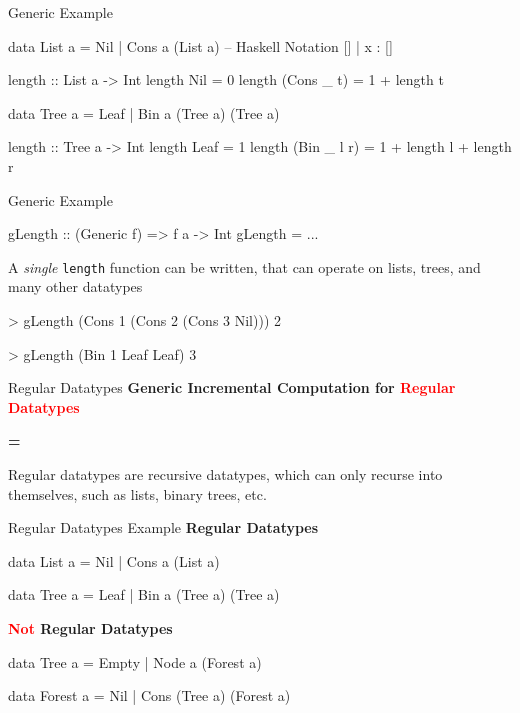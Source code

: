 \begin{slide}{Generic Example}
\begin{haskell}
data List a = Nil | Cons a (List a) -- Haskell Notation [] | x : [] 

length :: List a -> Int
length Nil        = 0
length (Cons _ t) = 1 + length t

data Tree a = Leaf | Bin a (Tree a) (Tree a)

length :: Tree a -> Int
length Leaf        = 1
length (Bin _ l r) = 1 + length l + length r
\end{haskell}
\end{slide}

\begin{slide}{Generic Example}
\begin{chaskell}
gLength :: (Generic f) => f a -> Int
gLength = ...
\end{chaskell}

A \textit{single} \texttt{length} function can be written, that can operate on lists, trees, and many other datatypes

\vspace*{0.5cm}
\begin{haskell}
> gLength (Cons 1 (Cons 2 (Cons 3 Nil)))
    2

> gLength (Bin 1 Leaf Leaf)
    3
\end{haskell}
\end{slide}


\begin{slide}{Regular Datatypes}
\centering
\large \textbf{Generic Incremental Computation for \textcolor{red}{Regular Datatypes}}

\vspace*{.5cm}
\textbf{=}
\vspace*{.5cm}

Regular datatypes are recursive datatypes, which can only recurse into themselves, such as lists, binary trees, etc. 

\end{slide}


\begin{slide}{Regular Datatypes Example}
\textbf{Regular Datatypes}

\begin{haskell}
data List a = Nil | Cons a (List a)

data Tree a = Leaf | Bin a (Tree a) (Tree a)
\end{haskell}

\vspace*{0.5cm}
\textbf{\textcolor{red}{Not} Regular Datatypes}

\begin{haskell}
data Tree a = Empty | Node a (Forest a)

data Forest a = Nil | Cons (Tree a) (Forest a)
\end{haskell}
\end{slide}